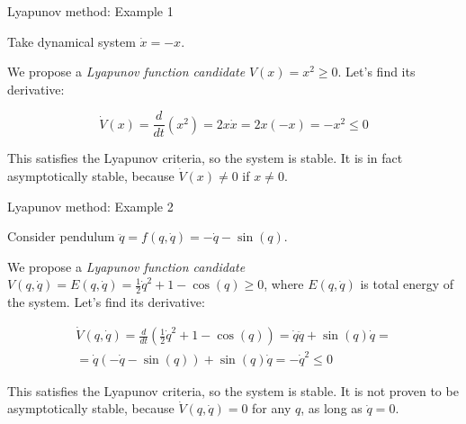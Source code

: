 \documentclass{beamer}
\begin{document}
\begin{frame}{Lyapunov method: Example 1}
\begin{flushleft}

Take dynamical system $\dot{x} = -x$. 

\bigskip

We propose a \emph{Lyapunov function candidate} $V(x) = x^2 \geq 0$. Let's find its derivative:

\begin{equation}
    \dot V(x) = 
    \frac{d}{dt}(  x^2  ) = 
    2x \dot x =
    2x (-x) =
    -x^2 \leq 0
\end{equation}

This satisfies the Lyapunov criteria, so the system is stable. It is in fact asymptotically stable, because $\dot V(x) \neq 0$ if $x \neq 0$.

\end{flushleft}
\end{frame}



\begin{frame}{Lyapunov method: Example 2}
	\begin{flushleft}
		
		Consider pendulum $\ddot{q} = f(q, \dot{q}) = -\dot{q} - \sin(q)$. 
		
		\bigskip
		
		We propose a \emph{Lyapunov function candidate} $V(q, \dot{q}) = E(q, \dot{q}) = \frac{1}{2} \dot{q}^2 + 1 - \cos(q)\geq 0$, where $E(q, \dot{q})$ is total energy of the system. Let's find its derivative:
		
		
		\begin{align}
			\dot V(q, \dot{q}) = 
			\frac{d}{dt} (\frac{1}{2} \dot{q}^2 + 1 - \cos(q)) =
			\dot{q} \ddot{q} + \sin(q)\dot{q} = \\
			=
			\dot{q} (-\dot{q} - \sin(q)) + \sin(q)\dot{q}
			=
			-\dot{q}^2 \leq 0
		\end{align}
		
		This satisfies the Lyapunov criteria, so the system is stable. It is not proven to be asymptotically stable, because $\dot V(q, \dot{q}) = 0$ for any $q$, as long as $\dot{q} = 0$.
		
	\end{flushleft}
\end{frame}
\end{document}

